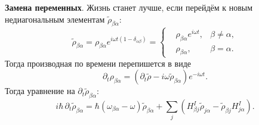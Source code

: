 \textbf{Замена переменных}. Жизнь станет лучше, если перейдём к новым недиагональным элементам \cite{main_2006} $\tilde{\rho}_{\beta \alpha}$:
\begin{equation*}
    \tilde{\rho}_{\beta \alpha} = \rho_{\beta \alpha} e^{i\omega t (1-\delta_{\alpha \beta})} = \left\{\begin{aligned}
        &\rho_{\beta \alpha} e^{i \omega t},  &\beta \neq \alpha, \\
        &\rho_{\beta \alpha},  &\beta=\alpha.
    \end{aligned}\right. 
\end{equation*}
Тогда производная по времени перепишется в виде
\begin{equation*}
    \partial_t \rho_{\beta \alpha} = \left(\partial_t \tilde{\rho} - i \omega \tilde{\rho}_{\beta \alpha}\right) e^{- i \omega t}.
\end{equation*}
Тогда уравнение на $\partial_t \tilde{\rho}_{\beta \alpha}$:
\begin{equation*}
    i \hbar\, \partial_t \tilde{\rho}_{\beta \alpha} = \hbar (\omega_{\beta \alpha}-\omega) \tilde{\rho}_{\beta \alpha} + \sum_j \left(H^I_{\beta j} \tilde{\rho}_{j \alpha} - \tilde{\rho}_{\beta j} H^{I}_{j \alpha}\right).
\end{equation*}

